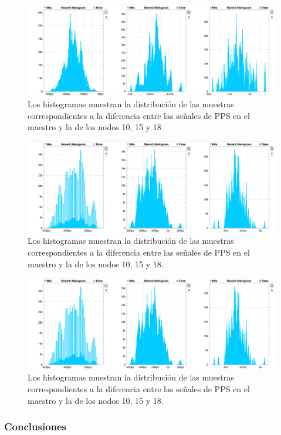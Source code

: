 \begin{figure}
	\centering
	\includegraphics[width=0.7\linewidth]{imagenes/hist_exp1}
	\caption[Histograma para cadena de 18 WR-LEN]{Los histogramas muestran la 
	distribución de las muestras correspondientes a la diferencia entre las 
	señales de PPS en el maestro y la de los nodos 10, 15 y 18.}
	\label{fig:histexp1}
\end{figure}

\begin{figure}
	\centering
	\includegraphics[width=0.7\linewidth]{imagenes/hist_exp3}
	\caption[Histograma para cadena de 15 WR-LEN]{Los histogramas muestran la 
		distribución de las muestras correspondientes a la diferencia entre las 
		señales de PPS en el maestro y la de los nodos 10, 15 y 18.}
	\label{fig:histexp2}
\end{figure}

\begin{figure}
	\centering
	\includegraphics[width=0.7\linewidth]{imagenes/hist_exp3}
	\caption[Histograma para cadena de 15 WR-LEN con un enlace de 5km]{Los 
	histogramas muestran la distribución de las muestras correspondientes a la 
	diferencia entre las señales de PPS en el maestro y la de los nodos 10, 15 
	y 18.}
	\label{fig:histexp3}
\end{figure}

\subsubsection{Conclusiones}

